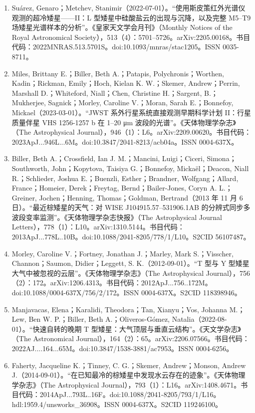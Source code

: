 \begin{enumerate}
\item Suárez, Genaro；Metchev, Stanimir（2022-07-01）。“使用斯皮策红外光谱仪观测的超冷矮星——II：L 型矮星中硅酸盐云的出现与沉降，以及完整 M5–T9 场矮星光谱样本的分析”。《皇家天文学会月刊》（Monthly Notices of the Royal Astronomical Society），513（4）：5701–5726。arXiv:2205.00168。书目代码：2022MNRAS.513.5701S。doi:10.1093/mnras/stac1205。ISSN 0035-8711。
\item Miles, Brittany E.；Biller, Beth A.；Patapis, Polychronis；Worthen, Kadin；Rickman, Emily；Hoch, Kielan K. W.；Skemer, Andrew；Perrin, Marshall D.；Whiteford, Niall；Chen, Christine H.；Sargent, B.；Mukherjee, Sagnick；Morley, Caroline V.；Moran, Sarah E.；Bonnefoy, Mickael（2023-03-01）。“JWST 系外行星系统直接观测早期科学计划 II：行星质量伴星 VHS 1256-1257 b 在 1–20 μm 波段的光谱”。《天体物理学杂志》（The Astrophysical Journal），946（1）：L6。arXiv:2209.00620。书目代码：2023ApJ...946L...6M。doi:10.3847/2041-8213/acb04a。ISSN 0004-637X。
\item Biller, Beth A.；Crossfield, Ian J. M.；Mancini, Luigi；Ciceri, Simona；Southworth, John；Kopytova, Taisiya G.；Bonnefoy, Mickaël；Deacon, Niall R.；Schlieder, Joshua E.；Buenzli, Esther；Brandner, Wolfgang；Allard, France；Homeier, Derek；Freytag, Bernd；Bailer-Jones, Coryn A. L.；Greiner, Jochen；Henning, Thomas；Goldman, Bertrand（2013 年 11 月 6 日）。“最近棕矮星的天气：对 WISE J104915.57–531906.1AB 的分辨式同步多波段变率监测”。《天体物理学杂志快报》（The Astrophysical Journal Letters），778（1）：L10。arXiv:1310.5144。书目代码：2013ApJ...778L..10B。doi:10.1088/2041-8205/778/1/L10。S2CID 56107487。
\item Morley, Caroline V.；Fortney, Jonathan J.；Marley, Mark S.；Visscher, Channon；Saumon, Didier；Leggett, S. K.（2012-09-01）。“T 型与 Y 型矮星大气中被忽视的云层”。《天体物理学杂志》（The Astrophysical Journal），756（2）：172。arXiv:1206.4313。书目代码：2012ApJ...756..172M。doi:10.1088/0004-637X/756/2/172。ISSN 0004-637X。S2CID 118398946。
\item Manjavacas, Elena；Karalidi, Theodora；Tan, Xianyu；Vos, Johanna M.；Lew, Ben W. P.；Biller, Beth A.；Oliveros-Gómez, Natalia（2022-08-01）。“快速自转的晚期 T 型矮星：大气顶层与垂直云结构”。《天文学杂志》（The Astronomical Journal），164（2）：65。arXiv:2206.07566。书目代码：2022AJ....164...65M。doi:10.3847/1538-3881/ac7953。ISSN 0004-6256。
\item Faherty, Jacqueline K.；Tinney, C. G.；Skemer, Andrew；Monson, Andrew J.（2014-09-01）。“在已知最冷的棕矮星中发现水云存在的迹象”。《天体物理学杂志》（The Astrophysical Journal），793（1）：L16。arXiv:1408.4671。书目代码：2014ApJ...793L..16F。doi:10.1088/2041-8205/793/1/L16。hdl:1959.4/unsworks_36908。ISSN 0004-637X。S2CID 119246100。

\end{enumerate}

